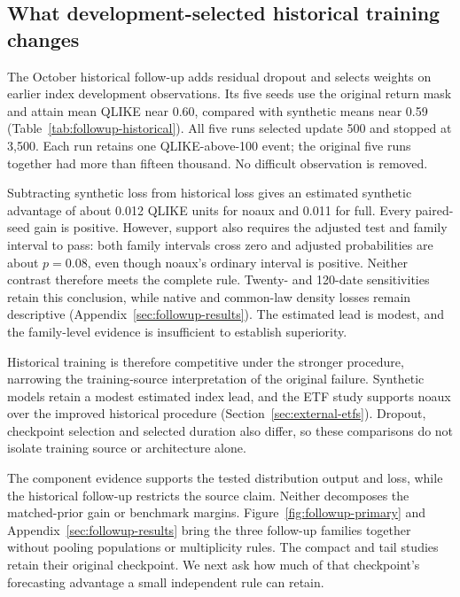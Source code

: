 \subsection{What development-selected historical training changes}
\label{sec:improved-historical}

The October historical follow-up adds residual dropout and selects weights on earlier index development observations. Its five seeds use the original return mask and attain mean QLIKE near 0.60, compared with synthetic means near 0.59 (Table~\ref{tab:followup-historical}). All five runs selected update 500 and stopped at 3,500. Each run retains one QLIKE-above-100 event; the original five runs together had more than fifteen thousand. No difficult observation is removed.



Subtracting synthetic loss from historical loss gives an estimated synthetic advantage of about 0.012 QLIKE units for noaux and 0.011 for full. Every paired-seed gain is positive. However, support also requires the adjusted test and family interval to pass: both family intervals cross zero and adjusted probabilities are about $p=0.08$, even though noaux's ordinary interval is positive. Neither contrast therefore meets the complete rule. Twenty- and 120-date sensitivities retain this conclusion, while native and common-law density losses remain descriptive (Appendix~\ref{sec:followup-results}). The estimated lead is modest, and the family-level evidence is insufficient to establish superiority.

Historical training is therefore competitive under the stronger procedure, narrowing the training-source interpretation of the original failure. Synthetic models retain a modest estimated index lead, and the ETF study supports noaux over the improved historical procedure (Section~\ref{sec:external-etfs}). Dropout, checkpoint selection and selected duration also differ, so these comparisons do not isolate training source or architecture alone.

The component evidence supports the tested distribution output and loss, while the historical follow-up restricts the source claim. Neither decomposes the matched-prior gain or benchmark margins. Figure~\ref{fig:followup-primary} and Appendix~\ref{sec:followup-results} bring the three follow-up families together without pooling populations or multiplicity rules. The compact and tail studies retain their original checkpoint. We next ask how much of that checkpoint's forecasting advantage a small independent rule can retain.

